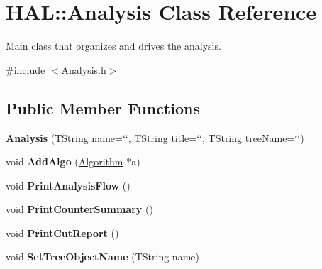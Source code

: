\hypertarget{class_h_a_l_1_1_analysis}{\section{H\+A\+L\+:\+:Analysis Class Reference}
\label{class_h_a_l_1_1_analysis}
}


Main class that organizes and drives the analysis.  




{\ttfamily \#include $<$Analysis.\+h$>$}

\subsection*{Public Member Functions}
\begin{DoxyCompactItemize}
\item 
\hypertarget{class_h_a_l_1_1_analysis_ab95bfff098f6a9543d444078cef3be91}{{\bfseries Analysis} (T\+String name=\char`\"{}\char`\"{}, T\+String title=\char`\"{}\char`\"{}, T\+String tree\+Name=\char`\"{}\char`\"{})}\label{class_h_a_l_1_1_analysis_ab95bfff098f6a9543d444078cef3be91}

\item 
\hypertarget{class_h_a_l_1_1_analysis_a8a4413dce12542ad4a4530f7a506d53b}{void {\bfseries Add\+Algo} (\hyperlink{class_h_a_l_1_1_algorithm}{Algorithm} $\ast$a)}\label{class_h_a_l_1_1_analysis_a8a4413dce12542ad4a4530f7a506d53b}

\item 
\hypertarget{class_h_a_l_1_1_analysis_af755ad7b542eb634144c99b1d142519c}{void {\bfseries Print\+Analysis\+Flow} ()}\label{class_h_a_l_1_1_analysis_af755ad7b542eb634144c99b1d142519c}

\item 
\hypertarget{class_h_a_l_1_1_analysis_ab43d960b19657610674983c5e893e78b}{void {\bfseries Print\+Counter\+Summary} ()}\label{class_h_a_l_1_1_analysis_ab43d960b19657610674983c5e893e78b}

\item 
\hypertarget{class_h_a_l_1_1_analysis_adb9295eeb04813bca9440f617452fec1}{void {\bfseries Print\+Cut\+Report} ()}\label{class_h_a_l_1_1_analysis_adb9295eeb04813bca9440f617452fec1}

\item 
\hypertarget{class_h_a_l_1_1_analysis_a56e97ef132e10b2a5f96c71c5145127b}{void {\bfseries Set\+Tree\+Object\+Name} (T\+String name)}\label{class_h_a_l_1_1_analysis_a56e97ef132e10b2a5f96c71c5145127b}


\end{DoxyCompactItemize}
